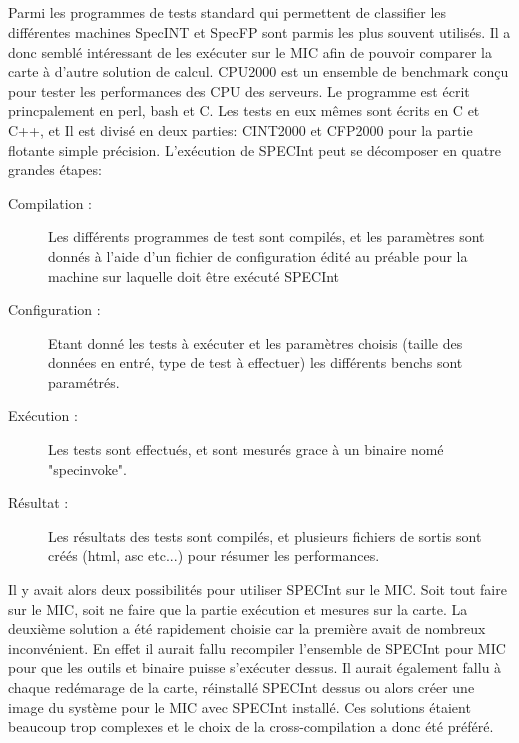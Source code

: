 \documentclass{article}
\begin{document}
					\subparagraph{}
					Parmi les programmes de tests standard qui permettent de classifier les différentes machines SpecINT et 
					SpecFP sont parmis les plus souvent utilisés. Il a donc semblé intéressant de les exécuter sur le MIC
					afin de pouvoir comparer la carte à d'autre solution de calcul. \newline
					CPU2000 est un ensemble de benchmark conçu pour tester les performances des CPU des serveurs. Le programme
					est écrit princpalement en perl, bash et C. Les tests en eux mêmes sont écrits en C et C++, et Il est 
					divisé en deux parties: CINT2000 et CFP2000 pour la partie flotante simple précision. \newline
					L'exécution de SPECInt peut se décomposer en quatre grandes étapes: \newline
					\begin{description}
					\item[Compilation :]
						Les différents programmes de test sont compilés, et les paramètres sont donnés à l'aide d'un fichier
						de configuration édité au préable pour la machine sur laquelle doit être exécuté SPECInt
					\item [Configuration :]
						Etant donné les tests à exécuter et les paramètres choisis (taille des données en entré, type de test
						à effectuer) les différents benchs sont paramétrés.
					\item [Exécution :]
						Les tests sont effectués, et sont mesurés grace à un binaire nomé "specinvoke".
					\item [Résultat :]
						Les résultats des tests sont compilés, et plusieurs fichiers de sortis sont créés (html, asc etc...)
						pour résumer les performances.
					\end{description}
					Il y avait alors deux possibilités pour utiliser SPECInt sur le MIC. Soit tout faire sur le MIC, soit 
					ne faire que la partie exécution et mesures sur la carte. \newline
					La deuxième solution a été rapidement choisie car la première avait de nombreux inconvénient. En effet il 
					aurait fallu recompiler l'ensemble de SPECInt pour MIC pour que les outils et binaire puisse s'exécuter
					dessus. Il aurait également fallu à chaque redémarage de la carte, réinstallé SPECInt dessus ou alors 
					créer une image du système pour le MIC avec SPECInt installé. Ces solutions étaient beaucoup trop complexes
					et le choix de la cross-compilation a donc été préféré. \newline
\end{document}
